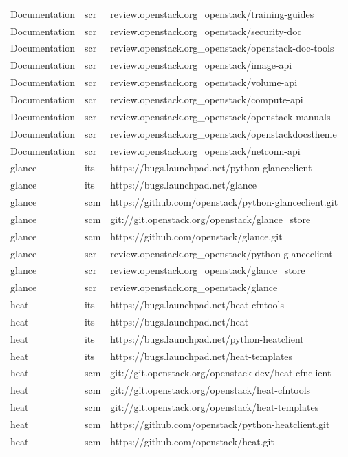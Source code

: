 \begin{center}
\begin{longtable}{|p{4cm}|p{1cm}|p{10cm}|}
Documentation&scr&review.openstack.org\_openstack/training-guides\\ 
Documentation&scr&review.openstack.org\_openstack/security-doc\\ 
Documentation&scr&review.openstack.org\_openstack/openstack-doc-tools\\ 
Documentation&scr&review.openstack.org\_openstack/image-api\\ 
Documentation&scr&review.openstack.org\_openstack/volume-api\\ 
Documentation&scr&review.openstack.org\_openstack/compute-api\\ 
Documentation&scr&review.openstack.org\_openstack/openstack-manuals\\ 
Documentation&scr&review.openstack.org\_openstack/openstackdocstheme\\ 
Documentation&scr&review.openstack.org\_openstack/netconn-api\\ 
glance&its&https://bugs.launchpad.net/python-glanceclient\\ 
glance&its&https://bugs.launchpad.net/glance\\ 
glance&scm&https://github.com/openstack/python-glanceclient.git\\ 
glance&scm&git://git.openstack.org/openstack/glance\_store\\ 
glance&scm&https://github.com/openstack/glance.git\\ 
glance&scr&review.openstack.org\_openstack/python-glanceclient\\ 
glance&scr&review.openstack.org\_openstack/glance\_store\\ 
glance&scr&review.openstack.org\_openstack/glance\\ 
heat&its&https://bugs.launchpad.net/heat-cfntools\\ 
heat&its&https://bugs.launchpad.net/heat\\ 
heat&its&https://bugs.launchpad.net/python-heatclient\\ 
heat&its&https://bugs.launchpad.net/heat-templates\\ 
heat&scm&git://git.openstack.org/openstack-dev/heat-cfnclient\\ 
heat&scm&git://git.openstack.org/openstack/heat-cfntools\\ 
heat&scm&git://git.openstack.org/openstack/heat-templates\\ 
heat&scm&https://github.com/openstack/python-heatclient.git\\ 
heat&scm&https://github.com/openstack/heat.git\\ 

\end{longtable}
\end{center}
